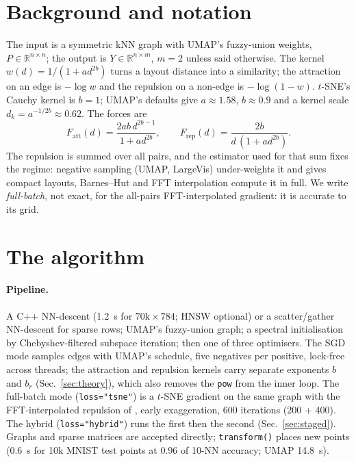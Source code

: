 \documentclass[11pt]{article}
\begin{document}
\section{Background and notation}
The input is a symmetric kNN graph with UMAP's fuzzy-union weights, $P \in \mathbb{R}^{n \times n}$;
the output is $Y \in \mathbb{R}^{n \times m}$, $m = 2$ unless said otherwise. The kernel
$w(d) = 1/(1 + a d^{2b})$ turns a layout distance into a similarity; the attraction on an edge is
$-\log w$ and the repulsion on a non-edge is $-\log(1 - w)$. $t$-SNE's Cauchy kernel is $b = 1$; UMAP's
defaults give $a \approx 1.58$, $b \approx 0.9$ and a kernel scale $d_k = a^{-1/2b} \approx 0.62$. The
forces are
\[
F_{\mathrm{att}}(d) = \frac{2ab\,d^{2b-1}}{1 + a d^{2b}}, \qquad
F_{\mathrm{rep}}(d) = \frac{2b}{d\,(1 + a d^{2b})}.
\]
The repulsion is summed over all pairs, and the estimator used for that sum fixes the regime: negative
sampling (UMAP, LargeVis) under-weights it and gives compact layouts, Barnes--Hut and FFT interpolation
\citep{linderman2019fitsne} compute it in full. We write \emph{full-batch}, not exact, for the all-pairs
FFT-interpolated gradient: it is accurate to its grid.

\section{The algorithm}\label{sec:algo}
\paragraph{Pipeline.} A C++ NN-descent (1.2~s for $70\mathrm{k} \times 784$; HNSW optional) or a
scatter/gather NN-descent for sparse rows; UMAP's fuzzy-union graph; a spectral initialisation by
Chebyshev-filtered subspace iteration; then one of three optimisers. The SGD mode samples edges with
UMAP's schedule, five negatives per positive, lock-free across threads; the attraction and repulsion
kernels carry separate exponents $b$ and $b_r$ (Sec.~\ref{sec:theory}), which also removes the
\texttt{pow} from the inner loop. The full-batch mode (\texttt{loss="tsne"}) is a $t$-SNE gradient on
the same graph with the FFT-interpolated repulsion of \citet{linderman2019fitsne}, early exaggeration,
600 iterations (200 + 400). The hybrid (\texttt{loss="hybrid"}) runs the first then the second
(Sec.~\ref{sec:staged}). Graphs and sparse matrices are accepted directly; \texttt{transform()} places
new points (0.6~s for 10k MNIST test points at 0.96 of 10-NN accuracy; UMAP 14.8~s).
\end{document}
